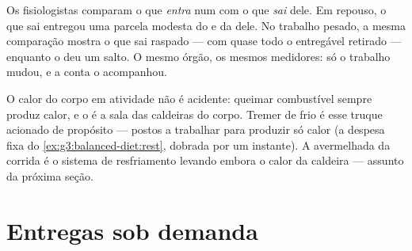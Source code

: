 \begin{example}\label{ex:g7:organs-at-work:measure}
Os fisiologistas comparam o  que \emph{entra} num  com o
 que \emph{sai} dele. Em repouso, o  que sai entregou uma
parcela modesta do  e da  dele. No trabalho pesado, a
mesma comparação mostra o  que sai raspado --- com quase todo o
 entregável retirado --- enquanto o  deu um salto.
O mesmo órgão, os mesmos medidores: só o trabalho mudou, e a conta o
acompanhou.
\end{example}

\begin{remark}\label{rem:g7:organs-at-work:warmth}
O calor do corpo em atividade não é acidente: queimar combustível
sempre produz calor, e o  é a sala das caldeiras do corpo.
Tremer de frio é esse truque acionado de propósito ---  postos
a trabalhar para produzir só calor (a despesa fixa do
\cref{ex:g3:balanced-diet:rest}, dobrada por um instante). A 
avermelhada da corrida é o sistema de resfriamento levando embora o
calor da caldeira --- assunto da próxima seção.
\end{remark}

\section{Entregas sob demanda}

